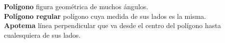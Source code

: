 \begin{tcolorbox}[
        enhanced,
        colback=orange!5!white,
        colframe=orange!35!white,
        coltitle=black,
        fonttitle=\bfseries,
        center title,
        title=Vocabulario]
    \textbf{Polígono} figura geométrica de muchos ángulos.\\
    \textbf{Polígono regular} polígono cuya medida de sus lados es la misma.\\
    \textbf{Apotema} línea perpendicular que va desde el centro del polígono hasta cualesquiera de sus lados.\\
\end{tcolorbox}